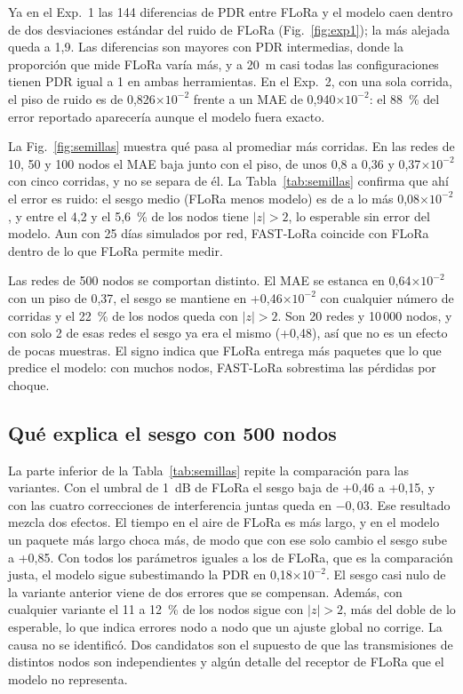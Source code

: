 \documentclass[conference,a4paper]{IEEEtran}
\begin{document}
Ya en el Exp.~1 las 144 diferencias de PDR entre FLoRa y el modelo caen dentro de dos desviaciones estándar del ruido de FLoRa (Fig.~\ref{fig:exp1}); la más alejada queda a 1,9. Las diferencias son mayores con PDR intermedias, donde la proporción que mide FLoRa varía más, y a 20~m casi todas las configuraciones tienen PDR igual a 1 en ambas herramientas. En el Exp.~2, con una sola corrida, el piso de ruido es de 0,826$\times10^{-2}$ frente a un MAE de 0,940$\times10^{-2}$: el 88~\% del error reportado aparecería aunque el modelo fuera exacto.

La Fig.~\ref{fig:semillas} muestra qué pasa al promediar más corridas. En las redes de 10, 50 y 100 nodos el MAE baja junto con el piso, de unos 0,8 a 0,36 y 0,37$\times10^{-2}$ con cinco corridas, y no se separa de él. La Tabla~\ref{tab:semillas} confirma que ahí el error es ruido: el sesgo medio (FLoRa menos modelo) es de a lo más 0,08$\times10^{-2}$, y entre el 4,2 y el 5,6~\% de los nodos tiene $|z|>2$, lo esperable sin error del modelo. Aun con 25 días simulados por red, FAST-LoRa coincide con FLoRa dentro de lo que FLoRa permite medir.

Las redes de 500 nodos se comportan distinto. El MAE se estanca en 0,64$\times10^{-2}$ con un piso de 0,37, el sesgo se mantiene en +0,46$\times10^{-2}$ con cualquier número de corridas y el 22~\% de los nodos queda con $|z|>2$. Son 20 redes y 10\,000 nodos, y con solo 2 de esas redes el sesgo ya era el mismo (+0,48), así que no es un efecto de pocas muestras. El signo indica que FLoRa entrega más paquetes que lo que predice el modelo: con muchos nodos, FAST-LoRa sobrestima las pérdidas por choque.

\subsection{Qué explica el sesgo con 500 nodos}
\label{sec:500}

La parte inferior de la Tabla~\ref{tab:semillas} repite la comparación para las variantes. Con el umbral de 1~dB de FLoRa el sesgo baja de +0,46 a +0,15, y con las cuatro correcciones de interferencia juntas queda en $-0{,}03$. Ese resultado mezcla dos efectos. El tiempo en el aire de FLoRa es más largo, y en el modelo un paquete más largo choca más, de modo que con ese solo cambio el sesgo sube a +0,85. Con todos los parámetros iguales a los de FLoRa, que es la comparación justa, el modelo sigue subestimando la PDR en 0,18$\times10^{-2}$. El sesgo casi nulo de la variante anterior viene de dos errores que se compensan. Además, con cualquier variante el 11 a 12~\% de los nodos sigue con $|z|>2$, más del doble de lo esperable, lo que indica errores nodo a nodo que un ajuste global no corrige. La causa no se identificó. Dos candidatos son el supuesto de que las transmisiones de distintos nodos son independientes y algún detalle del receptor de FLoRa que el modelo no representa.
\end{document}
